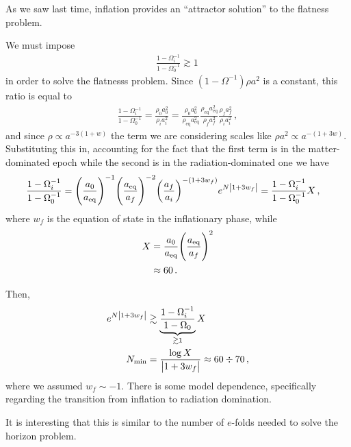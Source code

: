 \documentclass[main.tex]{subfiles}
\begin{document}

As we saw last time, inflation provides an ``attractor solution'' to the flatness problem. 

We must impose 
%
\begin{align}
\frac{1 - \Omega _i^{-1}}{1 - \Omega_0^{-1}} \gtrsim 1
\,
\end{align}
%
in order to solve the flatnesss problem. 
Since \(( 1- \Omega^{-1}) \rho a^2\) is a constant, this ratio is equal to 
%
\begin{align}
\frac{1 - \Omega _i^{-1}}{1 - \Omega_0^{-1}}
= 
\frac{\rho_0 a_0^2}{\rho _i a_i^2} 
= 
\frac{\rho_0 a_0^2}{\rho _{\text{eq}} a _{\text{eq}}^2}
\frac{{\rho _{\text{eq}} a _{\text{eq}}^2}}{\rho _f a_f^2} 
\frac{\rho _f a _f^2}{\rho _i a_i^2} 
\,,
\end{align}
%
and since \(\rho \propto a^{-3 (1+w)}\) the term we are considering scales like \(\rho a^2 \propto a^{-(1 + 3w)}\). 
Substituting this in, accounting for the fact that the first term is in the matter-dominated epoch while the second is in the radiation-dominated one we have 
%
\begin{align}
\frac{1 - \Omega _i^{-1}}{1 - \Omega_0^{-1}}
&= 
\qty(\frac{a_0 }{ a _{\text{eq}}})^{-1} 
\qty(\frac{a _{\text{eq}}}{a_f})^{-2}
\qty(\frac{a_f}{ a_i})^{-(1 + 3 w_f)}
e^{N \abs{1 + 3 w_f}} = \frac{1 - \Omega_i^{-1}}{1 - \Omega_0^{-1}} X
\,,
\end{align}
%
where \(w_f\) is the equation of state in the inflationary phase, while 
%
\begin{align}
X &= \frac{a_0 }{ a _{\text{eq}}}\qty(\frac{a _{\text{eq}}}{a_f})^2 \\
&\approx \num{60}
\,.
\end{align}


Then, 
%
\begin{align}
e^{N \abs{1 + 3 w_f}} &\gtrsim \underbrace{\frac{1 - \Omega _i^{-1}}{1-\Omega_0 }}_{\gtrsim 1} X \\
N _{\text{min}} &= \frac{\log X}{\abs{1 + 3 w_f }} \approx 60 \divisionsymbol 70
\,,
\end{align}
%
where we assumed \(w_f \sim -1\). There is some model dependence, specifically regarding the transition from inflation to radiation domination. 

It is interesting that this is similar to the number of \(e\)-folds needed to solve the horizon problem. 
\end{document}

